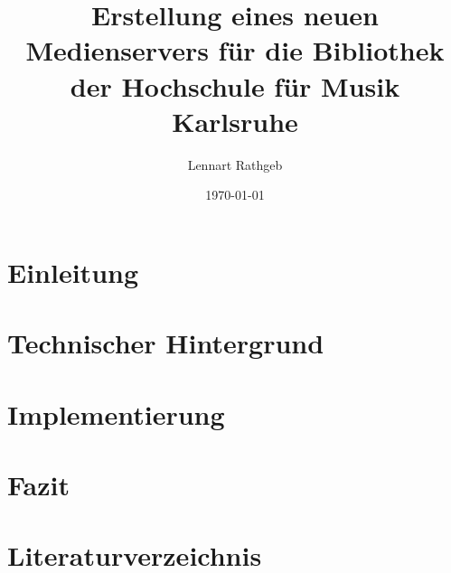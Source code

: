 \documentclass[12pt,a4paper]{article}
\title{Erstellung eines neuen Medienservers für die Bibliothek der Hochschule für Musik Karlsruhe}
\author{Lennart Rathgeb}
\date{\today}
\begin{document}
\maketitle

\tableofcontents
\newpage

\section{Einleitung}

\section{Technischer Hintergrund}

\section{Implementierung}

\section{Fazit}



\section{Literaturverzeichnis}

\printbibliography
\end{document}
